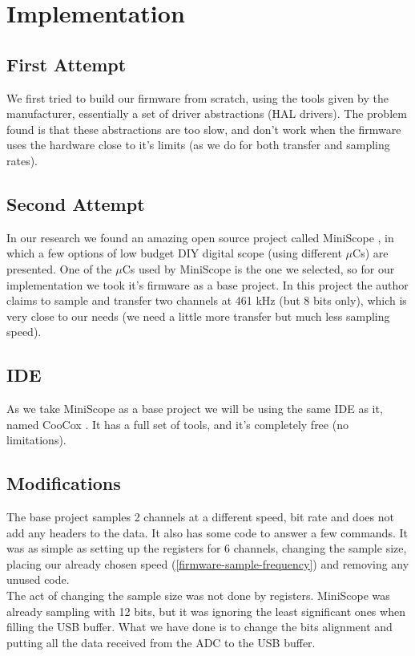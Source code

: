 \section{Implementation}
\label{firmware-implementation}

\subsection{First Attempt}
We first tried to build our firmware from scratch, using the tools given by the
manufacturer, essentially a set of driver abstractions (HAL drivers). The problem
found is that these abstractions are too slow, and don't work when the firmware
uses the hardware close to it's limits (as we do for both transfer and sampling rates).

\subsection{Second Attempt}
In our research we found an amazing open source project called MiniScope \cite{MiniScope},
in which a few options of low budget DIY digital scope (using different $\mu$Cs) are
presented. One of the $\mu$Cs used by MiniScope is the one we selected, so for our
implementation we took it's firmware as a base project. In this project the author
claims to sample and transfer two channels at 461 kHz (but 8 bits only), which is
very close to our needs (we need a little more transfer but much less sampling speed).

\subsection{IDE}
As we take MiniScope as a base project we will be using the same IDE as it, named
CooCox \cite{CooCox}. It has a full set of tools, and it's completely free (no limitations).

\subsection{Modifications}
The base project samples 2 channels at a different speed, bit rate and does not
add any headers to the data. It also has some code to answer a few commands. It
was as simple as setting up the registers for 6 channels, changing the sample size,
placing our already chosen speed (\autoref{firmware-sample-frequency}) and removing
any unused code. \\
The act of changing the sample size was not done by registers. MiniScope was already
sampling with 12 bits, but it was ignoring the least significant ones when filling
the USB buffer. What we have done is to change the bits alignment and putting all
the data received from the ADC to the USB buffer.

